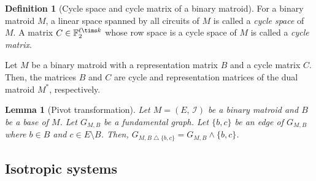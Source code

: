 \documentclass[twoside,10pt]{article}
\newtheorem{lemma}[theorem]{Lemma}
\theoremstyle{definition}
\newtheorem{definition}[theorem]{Definition}
\theoremstyle{remark}
\begin{document}
\begin{definition}[Cycle space and cycle matrix of a binary matroid]
For a binary matroid $M$, a linear space spanned by all circuits of $M$ is called a \textit{cycle space} of $M$.
A matrix $C\in\mathbb{F}_2^{\ell\tims k}$ whose row space is a cycle space of $M$ is called a \textit{cycle matrix}.
\end{definition}

Let $M$ be a binary matroid with a representation matrix $B$ and a cycle matrix $C$.
Then, the matrices $B$ and $C$ are cycle and representation matrices of the dual matroid $M^*$, respectively.
\fi

\begin{lemma}[Pivot transformation]
Let $M=(E,\,\mathcal{I})$ be a binary matroid and $B$ be a base of $M$.
Let $G_{M,B}$ be a fundamental graph.
Let $\{b,c\}$ be an edge of $G_{M,B}$ where $b\in B$ and $c\in E\setminus B$.
Then, $G_{M,B\bigtriangleup\{b,c\}} = G_{M,B} \wedge \{b,c\}$.
\end{lemma}


\subsection{Isotropic systems}
\end{document}
